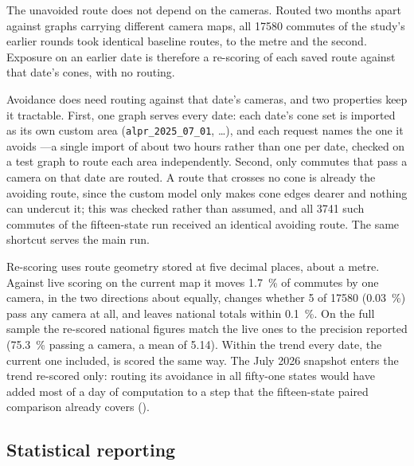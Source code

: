 \documentclass[11pt,twoside]{article}
\begin{document}
The unavoided route does not depend on the cameras. Routed two months apart against graphs
carrying different camera maps, all \num{17580} commutes of the study's earlier rounds took
identical baseline routes, to the metre and the second. Exposure on an earlier date is
therefore a re-scoring of each saved route against that date's cones, with no routing.

Avoidance does need routing against that date's cameras, and two properties keep it
tractable. First, one graph serves every date: each date's cone set is imported as its own
custom area (\texttt{alpr\_2025\_07\_01}, \ldots), and each request names the one it avoids
---a single import of about two hours rather than one per date, checked on a test graph to
route each area independently. Second, only commutes that pass a camera on that date are
routed. A route that crosses no cone is already the avoiding route, since the custom model
only makes cone edges dearer and nothing can undercut it; this was checked rather than
assumed, and all \num{3741} such commutes of the fifteen-state run received an identical
avoiding route. The same shortcut serves the main run.

Re-scoring uses route geometry stored at five decimal places, about a metre. Against live
scoring on the current map it moves \SI{1.7}{\percent} of commutes by one camera, in the two
directions about equally, changes whether 5 of \num{17580} (\SI{0.03}{\percent}) pass any
camera at all, and leaves national totals within \SI{0.1}{\percent}. On the full sample the
re-scored national figures match the live ones to the precision reported
(\SI{75.3}{\percent} passing a camera, a mean of \num{5.14}). Within the trend every date,
the current one included, is scored the same way. The July 2026 snapshot enters the trend
re-scored only: routing its avoidance in all fifty-one states would have added most of a day
of computation to a step that the fifteen-state paired comparison already covers
().

\subsection{Statistical reporting}
\label{sec:method:stats}
\end{document}
